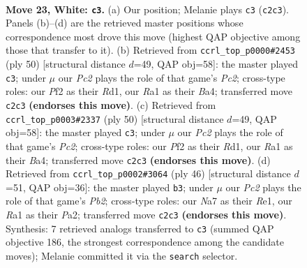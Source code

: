 \documentclass[11pt]{article}
\begin{document}
\clearpage

\begin{figure}[p]\centering
\begin{subfigure}{0.46\textwidth}\centering
\resizebox{\linewidth}{!}{%
\newchessgame
\chessboard[
  setfen={3k2r1/Nppnp2p/6p1/p7/1n3B1P/5P2/P1P1KP2/R7 w - - 3 23},
  showmover=false,
  pgfstyle=straightmove, color=movearrow, markmove={c2-c3}
]}
\caption{}
\end{subfigure}\hfill
\begin{subfigure}{0.46\textwidth}\centering
\resizebox{\linewidth}{!}{%
\newchessgame
\chessboard[
  setfen={2b3k1/p3pp1p/1r4p1/2N5/Bn4P1/5P2/PPPK4/3R4 w - - 3 26},
  showmover=false,
  pgfstyle=straightmove, color=movearrow, markmove={c2-c3}
]}
\caption{}
\end{subfigure}
\\[4pt]
\begin{subfigure}{0.46\textwidth}\centering
\resizebox{\linewidth}{!}{%
\newchessgame
\chessboard[
  setfen={2b3k1/p3pp1p/1r4p1/2N5/Bn4P1/5P2/PPPK4/3R4 w - - 3 26},
  showmover=false,
  pgfstyle=straightmove, color=movearrow, markmove={c2-c3}
]}
\caption{}
\end{subfigure}\hfill
\begin{subfigure}{0.46\textwidth}\centering
\resizebox{\linewidth}{!}{%
\newchessgame
\chessboard[
  setfen={5rk1/p4pp1/1p5p/3p4/2n2B2/6P1/PP3P1P/4R1K1 w - - 0 24},
  showmover=false,
  pgfstyle=straightmove, color=movearrow, markmove={b2-b3}
]}
\caption{}
\end{subfigure}
\caption{\textbf{Move 23, White: \texttt{c3}.} (a) Our position; Melanie plays \texttt{c3} (\texttt{c2c3}). Panels (b)--(d) are the retrieved master positions whose correspondence most drove this move (highest QAP objective among those that transfer to it). (b) Retrieved from \texttt{ccrl\_top\_p0000\#2453} (ply 50) [structural distance $d$=49, QAP obj=58]: the master played \texttt{c3}; under $\mu$ our \emph{Pc2} plays the role of that game's \emph{Pc2}; cross-type roles: our \emph{P}f2 as their \emph{R}d1, our \emph{R}a1 as their \emph{B}a4; transferred move \texttt{c2c3} \textbf{(endorses this move)}. (c) Retrieved from \texttt{ccrl\_top\_p0003\#2337} (ply 50) [structural distance $d$=49, QAP obj=58]: the master played \texttt{c3}; under $\mu$ our \emph{Pc2} plays the role of that game's \emph{Pc2}; cross-type roles: our \emph{P}f2 as their \emph{R}d1, our \emph{R}a1 as their \emph{B}a4; transferred move \texttt{c2c3} \textbf{(endorses this move)}. (d) Retrieved from \texttt{ccrl\_top\_p0002\#3064} (ply 46) [structural distance $d$=51, QAP obj=36]: the master played \texttt{b3}; under $\mu$ our \emph{Pc2} plays the role of that game's \emph{Pb2}; cross-type roles: our \emph{N}a7 as their \emph{R}e1, our \emph{R}a1 as their \emph{P}a2; transferred move \texttt{c2c3} \textbf{(endorses this move)}. Synthesis: 7 retrieved analogs transferred to \texttt{c3} (summed QAP objective 186, the strongest correspondence among the candidate moves); Melanie committed it via the \texttt{search} selector.}
\label{fig:thought-m44}
\end{figure}
\end{document}
